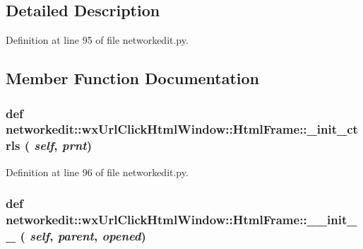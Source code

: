 \subsection{Detailed Description}




Definition at line 95 of file networkedit.py.

\subsection{Member Function Documentation}
\hypertarget{classnetworkedit_1_1wxUrlClickHtmlWindow_1_1HtmlFrame_2930185c7e28e2386998fba908fde7c8}{
\subsubsection[\_\-init\_\-ctrls]{\setlength{\rightskip}{0pt plus 5cm}def networkedit::wx\-Url\-Click\-Html\-Window::Html\-Frame::\_\-init\_\-ctrls ( {\em self},  {\em prnt})}}
\label{classnetworkedit_1_1wxUrlClickHtmlWindow_1_1HtmlFrame_2930185c7e28e2386998fba908fde7c8}




Definition at line 96 of file networkedit.py.\hypertarget{classnetworkedit_1_1wxUrlClickHtmlWindow_1_1HtmlFrame_84dbbfa164b9bfc3867064ef8ddc825c}{
\subsubsection[\_\-\_\-init\_\-\_\-]{\setlength{\rightskip}{0pt plus 5cm}def networkedit::wx\-Url\-Click\-Html\-Window::Html\-Frame::\_\-\_\-init\_\-\_\- ( {\em self},  {\em parent},  {\em opened})}}
\label{classnetworkedit_1_1wxUrlClickHtmlWindow_1_1HtmlFrame_84dbbfa164b9bfc3867064ef8ddc825c}




